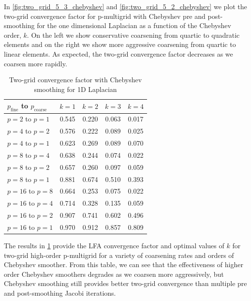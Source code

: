 \documentclass[review]{siamart190516}
\begin{document}
In \cref{fig:two_grid_5_3_chebyshev} and \cref{fig:two_grid_5_2_chebyshev} we plot the two-grid convergence factor for p-multigrid with Chebyshev pre and post-smoothing for the one dimensional Laplacian as a function of the Chebyshev order, $k$.
On the left we show conservative coarsening from quartic to quadratic elements and on the right we show more aggressive coarsening from quartic to linear elements.
As expected, the two-grid convergence factor decreases as we coarsen more rapidly.

\begin{table}[ht!]
\begin{center}
\begin{tabular}{l c c c c}
  \toprule
  $p_{\text{fine}}$ to $p_{\text{coarse}}$  &  $k = 1$   &  $k = 2$   &  $k = 3$   &  $k = 4$   \\
  \toprule
  $p = 2$ to $p = 1$   &  0.545  &  0.220  &  0.063  &  0.017  \\
  \midrule
  $p = 4$ to $p = 2$   &  0.576  &  0.222  &  0.089  &  0.025  \\
  $p = 4$ to $p = 1$   &  0.623  &  0.269  &  0.089  &  0.070  \\
  \midrule
  $p = 8$ to $p = 4$   &  0.638  &  0.244  &  0.074  &  0.022  \\
  $p = 8$ to $p = 2$   &  0.657  &  0.260  &  0.097  &  0.059  \\
  $p = 8$ to $p = 1$   &  0.881  &  0.674  &  0.510  &  0.393  \\
  \midrule
  $p = 16$ to $p = 8$  &  0.664  &  0.253  &  0.075  &  0.022  \\
  $p = 16$ to $p = 4$  &  0.714  &  0.328  &  0.135  &  0.059  \\
  $p = 16$ to $p = 2$  &  0.907  &  0.741  &  0.602  &  0.496  \\
  $p = 16$ to $p = 1$  &  0.970  &  0.912  &  0.857  &  0.809  \\
  \bottomrule
\end{tabular}
\end{center}
\caption{Two-grid convergence factor with Chebyshev smoothing for 1D Laplacian}
\label{table:two_grid_1d_chebyshev}
\end{table}

The results in \cref{table:two_grid_1d_chebyshev} provide the LFA convergence factor and optimal values of $k$ for two-grid high-order p-multigrid for a variety of coarsening rates and orders of Chebyshev smoother.
From this table, we can see that the effectiveness of higher order Chebyshev smoothers degrades as we coarsen more aggressively, but Chebyshev smoothing still provides better two-grid convergence than multiple pre and post-smoothing Jacobi iterations.
\end{document}
